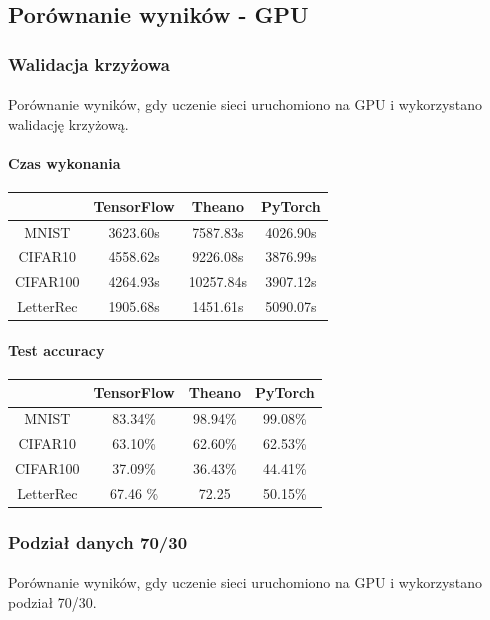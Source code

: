 \documentclass[a4paper,11pt]{article}
\begin{document}
\subsection{Porównanie wyników - GPU} 
\subsubsection{Walidacja krzyżowa}
\paragraph{}Porównanie wyników, gdy uczenie sieci uruchomiono na GPU i wykorzystano walidację krzyżową.
\paragraph{Czas wykonania}
\begin{tabular}{|c|c|c|c|}
\hline &TensorFlow & Theano & PyTorch \\ 
\hline MNIST &3623.60s &7587.83s  &4026.90s  \\ 
\hline CIFAR10 &4558.62s &9226.08s  &3876.99s  \\ 
\hline CIFAR100 &4264.93s &10257.84s  &3907.12s  \\ 
\hline LetterRec &1905.68s &1451.61s  &5090.07s  \\ 
\hline
\end{tabular}
\paragraph{Test accuracy}
\begin{tabular}{|c|c|c|c|}
\hline &TensorFlow & Theano & PyTorch \\ 
\hline MNIST &83.34\% &98.94\%  &99.08\%  \\ 
\hline CIFAR10 &63.10\%  &62.60\%  &62.53\%  \\ 
\hline CIFAR100 &37.09\% &36.43\%  &44.41\%  \\ 
\hline LetterRec &67.46 \% &72.25  &50.15\%  \\ 
\hline
\end{tabular}
\subsubsection{Podział danych 70/30}
\paragraph{}Porównanie wyników, gdy uczenie sieci uruchomiono na GPU i wykorzystano podział 70/30.
\end{document}
